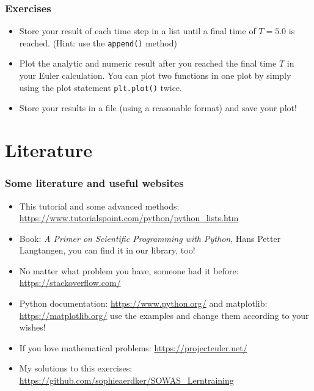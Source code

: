 \documentclass{beamer}
\begin{document}
\begin{frame}
\frametitle{Exercises}
	\begin{itemize}
		\item Store your result of each time step in a list until a final time of $T= 5.0$ is reached. (Hint: use the \texttt{append()} method)
		\item Plot the analytic and numeric result after you reached the final time $T$ in your Euler calculation. You can plot two functions in one plot by simply using the plot statement \texttt{plt.plot()} twice.
		\item Store your results in a file (using a reasonable format) and save your plot!
		
	\end{itemize}
\end{frame}


\section{Literature}
\begin{frame}
\frametitle{Some literature and useful websites}
	\begin{itemize}
		\item This tutorial and some advanced methods: \url{https://www.tutorialspoint.com/python/python_lists.htm}
		\item Book: \textit{A Primer on Scientific Programming with Python}, Hans Petter Langtangen, you can find it in our library, too!
		\item No matter what problem you have, someone had it before: \url{https://stackoverflow.com/}
		\item Python documentation: \url{https://www.python.org/} and matplotlib: \url{https://matplotlib.org/} use the examples and change them according to your wishes!
		\item If you love mathematical problems: \url{https://projecteuler.net/}
		\item My solutions to this exercises: \url{https://github.com/sophieaerdker/SOWAS_Lerntraining}
	\end{itemize}
\end{frame}
\end{document}

